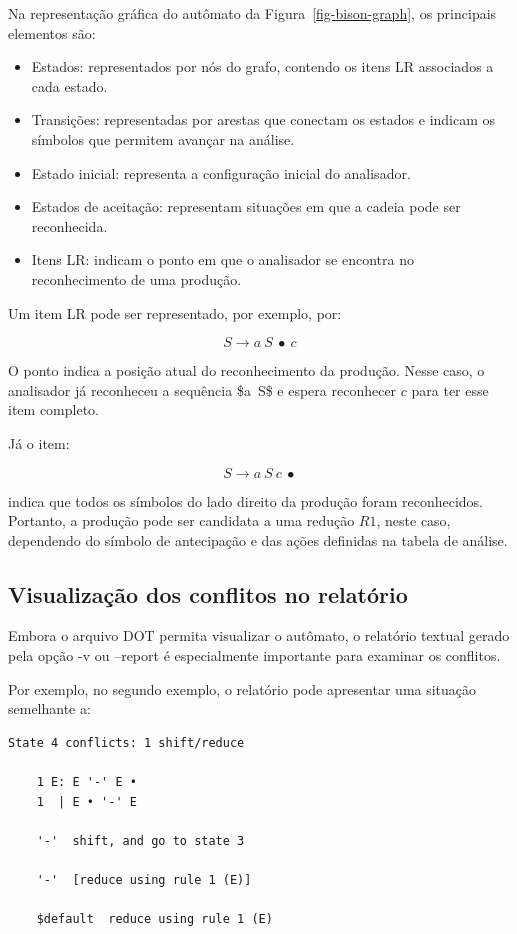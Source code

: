 \documentclass[
  brazilian,
  letterpaper,
]{book}
\providecommand{\tightlist}{%
  \setlength{\itemsep}{0pt}\setlength{\parskip}{0pt}}
\theoremstyle{plain}
\theoremstyle{definition}
\theoremstyle{remark}
\begin{document}
Na representação gráfica do autômato da Figura~\ref{fig-bison-graph}, os
principais elementos são:

\begin{itemize}
\tightlist
\item
  Estados: representados por nós do grafo, contendo os itens LR
  associados a cada estado.
\item
  Transições: representadas por arestas que conectam os estados e
  indicam os símbolos que permitem avançar na análise.
\item
  Estado inicial: representa a configuração inicial do analisador.
\item
  Estados de aceitação: representam situações em que a cadeia pode ser
  reconhecida.
\item
  Itens LR: indicam o ponto em que o analisador se encontra no
  reconhecimento de uma produção.
\end{itemize}

Um item LR pode ser representado, por exemplo, por:

\[
S\rightarrow a\ S\ \bullet\ c
\]

O ponto indica a posição atual do reconhecimento da produção. Nesse
caso, o analisador já reconheceu a sequência \$a~S\$ e espera reconhecer
\(c\) para ter esse item completo.

Já o item:

\[
S\rightarrow a\ S\ c\ \bullet
\]

indica que todos os símbolos do lado direito da produção foram
reconhecidos. Portanto, a produção pode ser candidata a uma redução
\(R1\), neste caso, dependendo do símbolo de antecipação e das ações
definidas na tabela de análise.

\subsection{Visualização dos conflitos no
relatório}\label{visualizauxe7uxe3o-dos-conflitos-no-relatuxf3rio}

Embora o arquivo DOT permita visualizar o autômato, o relatório textual
gerado pela opção -v ou --report é especialmente importante para
examinar os conflitos.

Por exemplo, no segundo exemplo, o relatório pode apresentar uma
situação semelhante a:

\begin{verbatim}
State 4 conflicts: 1 shift/reduce

    1 E: E '-' E •
    1  | E • '-' E

    '-'  shift, and go to state 3

    '-'  [reduce using rule 1 (E)]

    $default  reduce using rule 1 (E)
\end{verbatim}
\end{document}
